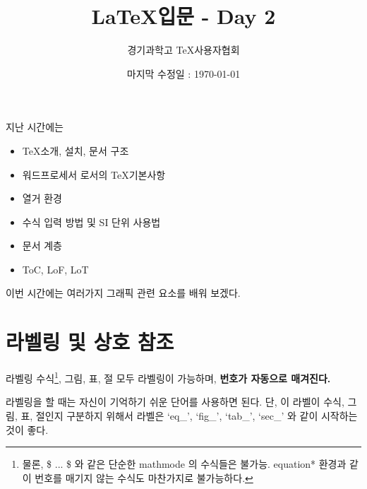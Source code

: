 \documentclass[12pt]{beamer}
\title[\LaTeX - Day 2]{\LaTeX 입문 - Day 2}
\author{경기과학고 \TeX 사용자협회}
\institute[GSHSTeXSociety]{\url{latex.gs.hs.kr}}
\date{마지막 수정일 : \today}
\begin{document}
\begin{frame}
\titlepage %
\end{frame}

\begin{frame}{지난 시간에는}
	\begin{itemize}
		\item \TeX 소개, 설치, 문서 구조
		\item 워드프로세서 로서의 \TeX 기본사항
		\item 열거 환경
		\item 수식 입력 방법 및 SI 단위 사용법
		\item 문서 계층
		\item ToC, LoF, LoT
	\end{itemize}
	이번 시간에는 여러가지 그래픽 관련 요소를 배워 보겠다.
\end{frame}

\section{라벨링 및 상호 참조}
\begin{frame}{라벨링}
	수식\footnote{물론, \$ ... \$ 와 같은 단순한 mathmode 의 수식들은 불가능. equation* 환경과 같이 번호를 매기지 않는 수식도 마찬가지로 불가능하다.}, 그림, 표, 절 모두 라벨링이 가능하며, \textbf{번호가 자동으로 매겨진다.}
	
	라벨링을 할 때는 자신이 기억하기 쉬운 단어를 사용하면 된다. 단, 이 라벨이 수식, 그림, 표, 절인지 구분하지 위해서 라벨은 `eq\_', `fig\_', `tab\_', `sec\_' 와 같이 시작하는 것이 좋다.

	
\end{frame}
\end{document}
